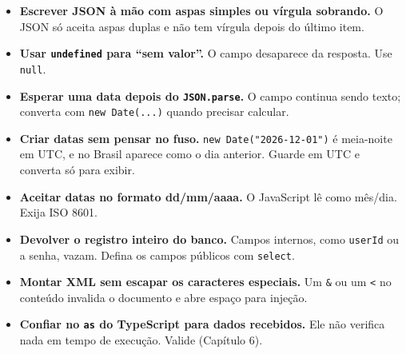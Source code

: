 \begin{itemize}
  \item \textbf{Escrever JSON à mão com aspas simples ou vírgula sobrando.} O JSON só aceita aspas duplas e não tem vírgula depois do último item.
  \item \textbf{Usar \texttt{undefined} para ``sem valor''.} O campo desaparece da resposta. Use \texttt{null}.
  \item \textbf{Esperar uma data depois do \texttt{JSON.parse}.} O campo continua sendo texto; converta com \texttt{new Date(...)} quando precisar calcular.
  \item \textbf{Criar datas sem pensar no fuso.} \texttt{new Date("2026-12-01")} é meia-noite em UTC, e no Brasil aparece como o dia anterior. Guarde em UTC e converta só para exibir.
  \item \textbf{Aceitar datas no formato dd/mm/aaaa.} O JavaScript lê como mês/dia. Exija ISO 8601.
  \item \textbf{Devolver o registro inteiro do banco.} Campos internos, como \texttt{userId} ou a senha, vazam. Defina os campos públicos com \texttt{select}.
  \item \textbf{Montar XML sem escapar os caracteres especiais.} Um \texttt{\&} ou um \texttt{<} no conteúdo invalida o documento e abre espaço para injeção.
  \item \textbf{Confiar no \texttt{as} do TypeScript para dados recebidos.} Ele não verifica nada em tempo de execução. Valide (Capítulo 6).
\end{itemize}
